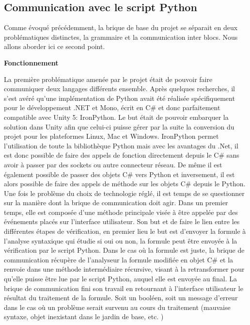 \subsection{Communication avec le script Python}

Comme évoqué précédemment, la brique de base du projet se séparait en deux problématiques distinctes, la grammaire et la communication inter blocs. Nous allons aborder ici ce second point.
\begin{center}\textbf{Fonctionnement}\end{center}
La première problématique amenée par le projet était de pouvoir faire communiquer deux langages différents ensemble.
Après quelques recherches, il s'est avéré qu'une implémentation de Python avait été réalisée spécifiquement pour le développement .NET et Mono, écrit en C\# et donc parfaitement compatible avec Unity 5: IronPython.
Le but était de pouvoir embarquer la solution dans Unity afin que celui-ci puisse gérer par la suite la conversion du projet pour les plateformes Linux, Mac et Windows.
IronPython permet l'utilisation de toute la bibliothèque Python mais avec les avantages du .Net, il est donc possible de faire des appels de fonction directement depuis le C\# sans avoir à passer par des sockets ou autre connecteur réseau. 
De même il est également possible de passer des objets C\# vers Python et inversement, il est alors possible de faire des appels de méthode sur les objets C\# depuis le Python.
Une fois le problème du choix de technologie réglé, il est temps de se questionner sur la manière dont la brique de communication doit agir.
Dans un premier temps, elle est composée d'une méthode principale visée à être appelée par des événements placés sur l'interface utilisateur. Son but et de faire le lien entre les différentes étapes de vérification, en premier lieu le but est d'envoyer la formule à l'analyse syntaxique qui étudie si oui ou non, la formule peut être envoyée à la vérification par le script Python.
Dans le cas où la formule est juste, la brique de communication récupère de l'analyseur la formule modifiée en objet C\# et la renvoie dans une méthode intermédiaire récursive, visant à la retransformer pour qu'elle puisse être lue par le script Python, auquel elle est envoyée au final.
La brique de communication fini son travail en retournant à l'interface utilisateur le résultat du traitement de la formule. Soit un booléen, soit un message d'erreur dans le cas où un problème serait survenu au cours du traitement (mauvaise syntaxe, objet inexistant dans le jardin de base, etc. )

